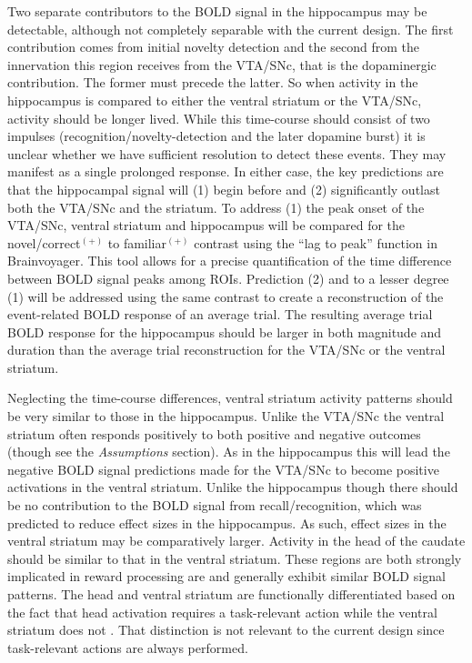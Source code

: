 \documentclass[doc]{apa}        %
\begin{document}
Two separate contributors to the BOLD signal in the hippocampus may be detectable, although not completely separable with the current design.  The first contribution comes from initial novelty detection and the second from the innervation this region receives from the VTA/SNc, that is the dopaminergic contribution.  The former must precede the latter.  So when activity in the hippocampus is compared to either the ventral striatum or the VTA/SNc, activity should be longer lived.  While this time-course should consist of two impulses (recognition/novelty-detection and the later dopamine burst) it is unclear whether we have sufficient resolution to detect these events.  They may manifest as a single prolonged response.  In either case, the key predictions are that the hippocampal signal will (1) begin before and (2) significantly outlast both the VTA/SNc and the striatum.  To address (1) the peak onset of the VTA/SNc, ventral striatum and hippocampus will be compared for the novel/correct$^{(+)}$ to familiar$^{(+)}$ contrast using the ``lag to peak'' function in Brainvoyager.  This tool allows for a precise quantification of the time difference between BOLD signal peaks among ROIs.  Prediction (2) and to a lesser degree (1) will be addressed using the same contrast to create a reconstruction of the event-related BOLD response of an average trial.  The resulting average trial BOLD response for the hippocampus should be larger in both magnitude and duration than the average trial reconstruction for the VTA/SNc or the ventral striatum.

Neglecting the time-course differences, ventral striatum activity patterns should be very similar to those in the hippocampus.  Unlike the VTA/SNc the ventral striatum often responds positively to both positive and negative outcomes (though see the \emph{Assumptions} section).  As in the hippocampus this will lead the negative BOLD signal predictions made for the VTA/SNc to become positive activations in the ventral striatum.  Unlike the hippocampus though there should be no contribution to the BOLD signal from recall/recognition, which was predicted to reduce effect sizes in the hippocampus.  As such, effect sizes in the ventral striatum may be comparatively larger.  Activity in the head of the caudate should be similar to that in the ventral striatum.  These regions are both strongly implicated in reward processing are and generally exhibit similar BOLD signal patterns.  The head and ventral striatum are functionally differentiated based on the fact that head activation requires a task-relevant action while the ventral striatum does not \cite{ODoherty:2004p1269,Yin:2008p6347}.  That distinction is not relevant to the current design since task-relevant actions are always performed.
\end{document}
